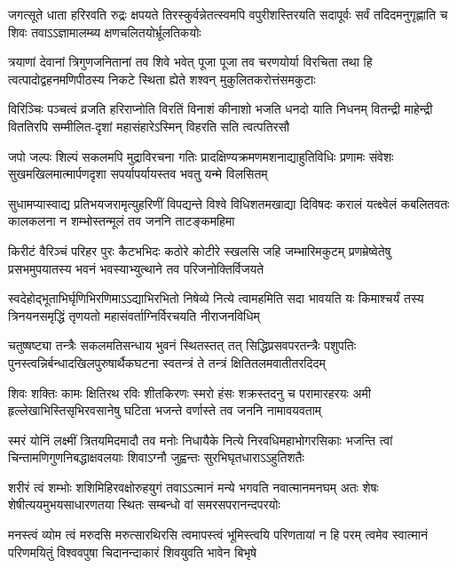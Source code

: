 \fourlineindentedshloka
{जगत्सूते धाता हरिरवति रुद्रः क्षपयते}
{तिरस्कुर्वन्नेतत्स्वमपि वपुरीशस्तिरयति}
{सदापूर्वः सर्वं तदिदमनुगृह्णाति च शिवः}
{तवाऽऽज्ञामालम्ब्य क्षणचलितयोर्भ्रूलतिकयोः}%

\fourlineindentedshloka
{त्रयाणां देवानां त्रिगुणजनितानां तव शिवे}
{भवेत् पूजा पूजा तव चरणयोर्या विरचिता}
{तथा हि त्वत्पादोद्वहनमणिपीठस्य निकटे}
{स्थिता ह्येते शश्वन् मुकुलितकरोत्तंसमकुटाः}%

\fourlineindentedshloka
{विरिञ्चिः पञ्चत्वं व्रजति हरिराप्नोति विरतिं}
{विनाशं कीनाशो भजति धनदो याति निधनम्}
{वितन्द्री माहेन्द्री विततिरपि सम्मीलित-दृशां}
{महासंहारेऽस्मिन् विहरति सति त्वत्पतिरसौ}%

\fourlineindentedshloka
{जपो जल्पः शिल्पं सकलमपि मुद्राविरचना}
{गतिः प्रादक्षिण्यक्रमणमशनाद्याहुतिविधिः}
{प्रणामः संवेशः सुखमखिलमात्मार्पणदृशा}
{सपर्यापर्यायस्तव भवतु यन्मे विलसितम्}%

\fourlineindentedshloka
{सुधामप्यास्वाद्य प्रतिभयजरामृत्युहरिणीं}
{विपद्यन्ते विश्वे विधिशतमखाद्या दिविषदः}
{करालं यत्क्ष्वेलं कबलितवतः कालकलना}
{न शम्भोस्तन्मूलं तव जननि ताटङ्कमहिमा}%

\fourlineindentedshloka
{किरीटं वैरिञ्चं परिहर पुरः कैटभभिदः}
{कठोरे कोटीरे स्खलसि जहि जम्भारिमकुटम्}
{प्रणम्रेष्वेतेषु प्रसभमुपयातस्य भवनं}
{भवस्याभ्युत्थाने तव परिजनोक्तिर्विजयते}%

\fourlineindentedshloka
{स्वदेहोद्भूताभिर्घृणिभिरणिमाऽऽद्याभिरभितो}
{निषेव्ये नित्ये त्वामहमिति सदा भावयति यः}
{किमाश्चर्यं तस्य त्रिनयनसमृद्धिं तृणयतो}
{महासंवर्ताग्निर्विरचयति नीराजनविधिम्}%

\fourlineindentedshloka
{चतुष्षष्ट्या तन्त्रैः सकलमतिसन्धाय भुवनं}
{स्थितस्तत् तत्  सिद्धिप्रसवपरतन्त्रैः पशुपतिः}
{पुनस्त्वन्निर्बन्धादखिलपुरुषार्थैकघटना}
{स्वतन्त्रं ते तन्त्रं क्षितितलमवातीतरदिदम्}%

\fourlineindentedshloka
{शिवः शक्तिः कामः क्षितिरथ रविः शीतकिरणः}
{स्मरो हंसः शक्रस्तदनु च परामारहरयः}
{अमी हृल्लेखाभिस्तिसृभिरवसानेषु घटिता}
{भजन्ते वर्णास्ते तव जननि नामावयवताम्}%

\fourlineindentedshloka
{स्मरं योनिं लक्ष्मीं त्रितयमिदमादौ तव मनोः}
{निधायैके नित्ये निरवधिमहाभोगरसिकाः}
{भजन्ति त्वां चिन्तामणिगुणनिबद्धाक्षवलयाः}
{शिवाऽग्नौ जुह्वन्तः सुरभिघृतधाराऽऽहुतिशतैः}%

\fourlineindentedshloka
{शरीरं त्वं शम्भोः शशिमिहिरवक्षोरुहयुगं}
{तवाऽऽत्मानं मन्ये भगवति नवात्मानमनघम्}
{अतः शेषः शेषीत्ययमुभयसाधारणतया}
{स्थितः सम्बन्धो वां समरसपरानन्दपरयोः}%

\fourlineindentedshloka
{मनस्त्वं व्योम त्वं मरुदसि मरुत्सारथिरसि}
{त्वमापस्त्वं भूमिस्त्वयि परिणतायां न हि परम्}
{त्वमेव स्वात्मानं परिणमयितुं विश्ववपुषा}
{चिदानन्दाकारं शिवयुवति भावेन बिभृषे}%

